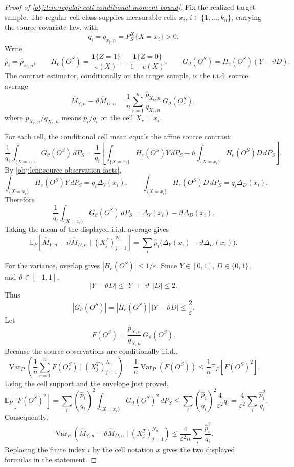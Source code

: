 \begin{proof}[Proof of \cref{obj:lem:regular-cell-conditional-moment-bound}]
Fix the realized target sample. The regular-cell class supplies measurable cells \(x_i\), \(i\in\{1,\ldots,k_n\}\), carrying the source covariate law, with
\[
q_i=q_{x_i,n}=P_S^X\{X=x_i\}>0 .
\] %
Write
\[
\widehat p_i=\widehat p_{x_i,n},
\qquad
H_e(O^S)=\frac{\mathbf 1\{Z=1\}}{e(X)}
-\frac{\mathbf 1\{Z=0\}}{1-e(X)},
\qquad
G_\vartheta(O^S)=H_e(O^S)(Y-\vartheta D).
\]
The contrast estimator, conditionally on the target sample, is the i.i.d. source average
\[
\widehat M_{Y,n}-\vartheta\widehat M_{D,n}
=
\frac1n\sum_{r=1}^n
\frac{\widehat p_{X_r,n}}{q_{X_r,n}}\,
G_\vartheta(O_r^S),
\]
where \(\widehat p_{X_r,n}/q_{X_r,n}\) means \(\widehat p_i/q_i\) on the cell \(X_r=x_i\). %

For each cell, the conditional cell mean equals the affine source contrast:
\[
\frac1{q_i}
\int_{\{X=x_i\}}G_\vartheta(O^S)\,dP_S
=
\frac1{q_i}
\left[
\int_{\{X=x_i\}}H_e(O^S)Y\,dP_S
-
\vartheta
\int_{\{X=x_i\}}H_e(O^S)D\,dP_S
\right].
\] %
By \cref{obj:lem:source-observation-facts},
\[
\int_{\{X=x_i\}}H_e(O^S)Y\,dP_S
=
q_i\Delta_Y(x_i),
\qquad
\int_{\{X=x_i\}}H_e(O^S)D\,dP_S
=
q_i\Delta_D(x_i).
\]
Therefore
\[
\frac1{q_i}
\int_{\{X=x_i\}}G_\vartheta(O^S)\,dP_S
=
\Delta_Y(x_i)-\vartheta\Delta_D(x_i).
\] %
Taking the mean of the displayed i.i.d. average gives
\[
\mathbb E_P\!\left[
\widehat M_{Y,n}-\vartheta\widehat M_{D,n}
\mid (X_j^T)_{j=1}^{N_n}
\right]
=
\sum_i
\widehat p_i\bigl(\Delta_Y(x_i)-\vartheta\Delta_D(x_i)\bigr).
\] %

For the variance, overlap gives \(|H_e(O^S)|\le1/\varepsilon\). Since \(Y\in[0,1]\), \(D\in\{0,1\}\), and \(\vartheta\in[-1,1]\),
\[
|Y-\vartheta D|
\le |Y|+|\vartheta|\,|D|
\le 2 .
\]
Thus
\[
|G_\vartheta(O^S)|
=
|H_e(O^S)|\,|Y-\vartheta D|
\le
\frac2\varepsilon .
\] %
Let
\[
F(O^S)=\frac{\widehat p_{X,n}}{q_{X,n}}\,G_\vartheta(O^S).
\]
Because the source observations are conditionally i.i.d.,
\[
\operatorname{Var}_P\!\left(
\frac1n\sum_{r=1}^n F(O_r^S)
\mid (X_j^T)_{j=1}^{N_n}
\right)
=
\frac1n\operatorname{Var}_P(F(O^S))
\le
\frac1n\mathbb E_P[F(O^S)^2].
\] %
Using the cell support and the envelope just proved,
\[
\mathbb E_P[F(O^S)^2]
=
\sum_i
\left(\frac{\widehat p_i}{q_i}\right)^2
\int_{\{X=x_i\}}G_\vartheta(O^S)^2\,dP_S
\le
\sum_i
\left(\frac{\widehat p_i}{q_i}\right)^2
\frac4{\varepsilon^2}q_i
=
\frac4{\varepsilon^2}
\sum_i\frac{\widehat p_i^2}{q_i}.
\] %
Consequently,
\[
\operatorname{Var}_P\!\left(
\widehat M_{Y,n}-\vartheta\widehat M_{D,n}
\mid (X_j^T)_{j=1}^{N_n}
\right)
\le
\frac4{\varepsilon^2 n}
\sum_i\frac{\widehat p_i^2}{q_i}.
\] %
Replacing the finite index \(i\) by the cell notation \(x\) gives the two displayed formulas in the statement. %
\end{proof}
